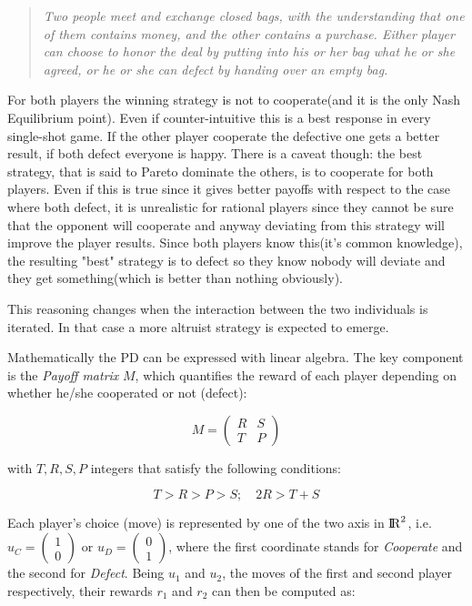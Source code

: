 \documentclass[journal,a4paper,10pt,twoside]{IEEEtran}
\begin{document}
\begin{quote}
\textit{Two people meet and exchange closed bags, with the understanding that one of them contains money, and the other contains a purchase. Either player can choose to honor the deal by putting into his or her bag what he or she agreed, or he or she can defect by handing over an empty bag.}
\end{quote}

For both players the winning strategy is not to cooperate(and it is the only Nash Equilibrium point). Even if counter-intuitive this is a best response in every single-shot game. If the other player cooperate the defective one gets a better result, if both defect everyone is happy. There is a caveat though: the best strategy, that is said to Pareto dominate the others, is to cooperate for both players. Even if this is true since it gives better payoffs with respect to the case where both defect, it is unrealistic for rational players since they cannot be sure that the opponent will cooperate and anyway deviating from this strategy will improve the player results. Since both players know this(it's common knowledge), the resulting "best" strategy is to defect so they know nobody will deviate and they get something(which is better than nothing obviously).

This reasoning changes when the interaction between the two individuals is iterated. In that case a more altruist strategy is expected to emerge.

Mathematically the PD can be expressed with linear algebra. The key component is the \textit{Payoff matrix} $M$, which quantifies the reward of each player depending on whether he/she cooperated or not (defect):

$$
M = 
\begin{pmatrix} 
R & S \\
T & P 
\end{pmatrix}
$$

with $T,R,S,P$ integers that satisfy the following conditions:

$$
T>R>P>S; \quad 2R > T+S
$$

Each player's choice (move) is represented by one of the two axis in ${\rm I\!R}^2$, i.e. $u_C=\begin{pmatrix} 1 \\ 0 \end{pmatrix}$ or $u_D=\begin{pmatrix} 0 \\ 1 \end{pmatrix}$, where the first coordinate stands for \textit{Cooperate} and the second for \textit{Defect}. Being $u_1$ and $u_2$, the moves of the first and second player respectively, their rewards $r_1$ and $r_2$ can then be computed as:
\end{document}
